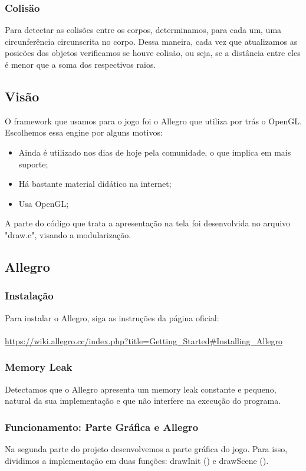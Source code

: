 \documentclass{article}
\begin{document}
\subsubsection{Colisäo}
Para detectar as colisões entre os corpos, determinamos, para cada um, uma circunferência circunscrita no corpo. Dessa maneira, cada vez que atualizamos as posicões dos objetos verificamos se houve colisão, ou seja, se a distância entre eles é menor que a soma dos respectivos raios.

\subsection{Visão}
O framework que usamos para o jogo foi o Allegro que utiliza por trás o OpenGL. Escolhemos essa engine por alguns motivos: \\
\begin{itemize}
    \item Ainda é utilizado nos dias de hoje pela comunidade, o que implica em mais suporte;
    \item Há bastante material didático na internet;
    \item Usa OpenGL;
\end{itemize}
A parte do código que trata a apresentação na tela foi desenvolvida no arquivo "draw.c", visando a modularização.

\subsection{Allegro}
\subsubsection{Instalação}
Para instalar o Allegro, siga as instruções da página oficial: \\ \\
\url{https://wiki.allegro.cc/index.php?title=Getting\_Started#Installing\_Allegro}

\subsubsection{Memory Leak}
Detectamos que o Allegro apresenta um memory leak constante e pequeno, natural da sua implementação e que não interfere na execução do programa.

\subsubsection{Funcionamento: Parte Gráfica e Allegro}
Na segunda parte do projeto desenvolvemos a parte gráfica do jogo. Para isso, dividimos a implementação em duas funções: drawInit () e drawScene ().
\end{document}
